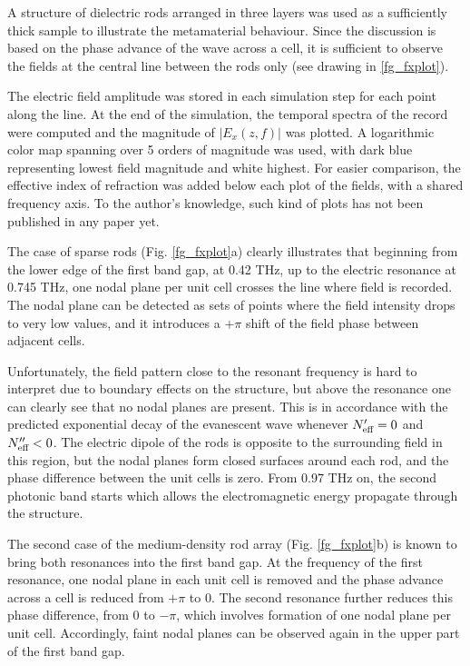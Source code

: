 A structure of dielectric rods arranged in three layers was used as a sufficiently thick sample to illustrate the metamaterial behaviour. Since the discussion is based on the phase advance of the wave across a cell, it is sufficient to observe the fields at the central line between the rods only (see drawing in \ref{fg_fxplot}).

The electric field amplitude was stored in each simulation step for each point along the line.
At the end of the simulation, the temporal spectra of the record were computed and the magnitude of $|E_x(z, f)|$ was plotted. A logarithmic color map spanning over 5 orders of magnitude was used, with dark blue representing lowest field magnitude and white highest. For easier comparison, the effective index of refraction was added below each plot of the fields, with a shared frequency axis.
To the author's knowledge, such kind of plots has not been published in any paper yet. 

The case of sparse rods (Fig. \ref{fg_fxplot}a) clearly illustrates that beginning from the lower edge of the first band gap, at 0.42 THz, up to the electric resonance at 0.745 THz, one nodal plane per unit cell crosses the line where field is recorded. The nodal plane can be detected as sets of points where the field intensity drops to very low values, and it introduces a $+\pi$ shift of the field phase between adjacent cells. 

Unfortunately, the field pattern close to the resonant frequency is hard to interpret due to boundary effects on the structure, but above the resonance one can clearly see that no nodal planes are present. This is in accordance with the predicted exponential decay of the evanescent wave whenever $N_{\text{eff} }' = 0$ and $N_{\text{eff} }'' < 0$. The electric dipole of the rods is opposite to the surrounding field in this region, but the nodal planes form closed surfaces around each rod, and the phase difference between the unit cells is zero. From 0.97 THz on, the second photonic band starts which allows the electromagnetic energy propagate through the structure.

The second case of the medium-density rod array (Fig. \ref{fg_fxplot}b) is known to bring both resonances into the first band gap. At the frequency of the first resonance, one nodal plane in each unit cell is removed and the phase advance across a cell is reduced from $+\pi$ to $0$. The second resonance further reduces this phase difference, from $0$ to $-\pi$, which involves formation of one nodal plane per unit cell. Accordingly, faint nodal planes can be observed again in the upper part of the first band gap. 

